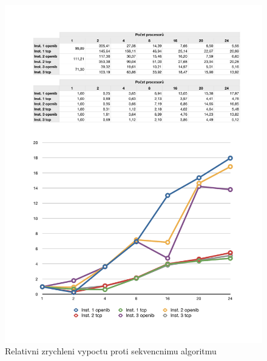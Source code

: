 \documentclass[a4paper]{article}
\begin{document}
\begin{figure}[ht]
\centerline{\includegraphics[width=\textwidth]{table-rel.pdf}}
\caption{Relativni zrychleni vypoctu proti sekvencnimu algoritmu}
\label{table-rel}
\end{figure}
\end{document}
